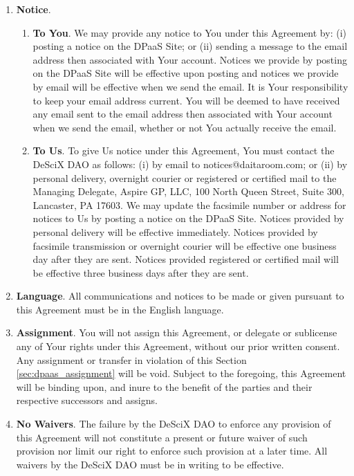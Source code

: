 \documentclass{article}
\begin{document}
\begin{enumerate}
\begin{enumerate}
        \item \textbf{Notice}.
        \begin{enumerate}
            \item \textbf{To You}. We may provide any notice to You under this Agreement by: (i) posting a notice on the DPaaS Site; or (ii) sending a message to the email address then associated with Your account. Notices we provide by posting on the DPaaS Site will be effective upon posting and notices we provide by email will be effective when we send the email. It is Your responsibility to keep your email address current. You will be deemed to have received any email sent to the email address then associated with Your account when we send the email, whether or not You actually receive the email.
            \item \textbf{To Us}. To give Us notice under this Agreement, You must contact the DeSciX DAO as follows: (i) by email to notices@daitaroom.com; or (ii) by personal delivery, overnight courier or registered or certified mail to the Managing Delegate, Aspire GP, LLC, 100 North Queen Street, Suite 300, Lancaster, PA 17603. We may update the facsimile number or address for notices to Us by posting a notice on the DPaaS Site. Notices provided by personal delivery will be effective immediately. Notices provided by facsimile transmission or overnight courier will be effective one business day after they are sent. Notices provided registered or certified mail will be effective three business days after they are sent.
        \end{enumerate}
        
        \item \textbf{Language}. All communications and notices to be made or given pursuant to this Agreement must be in the English language.
        
        \item \textbf{Assignment}. You will not assign this Agreement, or delegate or sublicense any of Your rights under this Agreement, without our prior written consent. Any assignment or transfer in violation of this Section \ref{sec:dpaas_assignment} will be void. Subject to the foregoing, this Agreement will be binding upon, and inure to the benefit of the parties and their respective successors and assigns.
        
        \item \textbf{No Waivers}. The failure by the DeSciX DAO to enforce any provision of this Agreement will not constitute a present or future waiver of such provision nor limit our right to enforce such provision at a later time. All waivers by the DeSciX DAO must be in writing to be effective.
        

\end{enumerate}
\end{enumerate}
\end{document}
